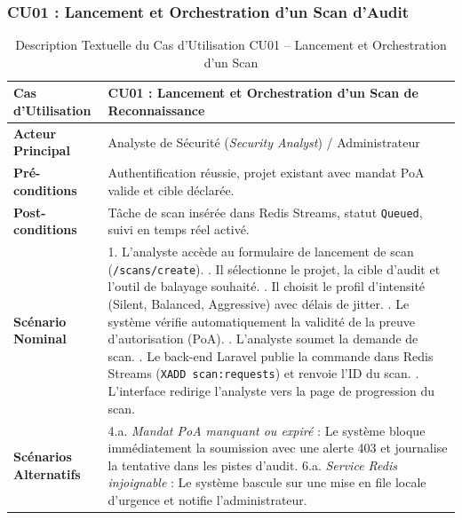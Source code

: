 \subsubsection*{CU01 : Lancement et Orchestration d'un Scan d'Audit}
\begin{table}[H]
\centering
\caption{Description Textuelle du Cas d'Utilisation CU01 -- Lancement et Orchestration d'un Scan}
\label{tab:cu01}
\begin{tabular}{|p{3.5cm}|p{11.5cm}|}
\hline
\textbf{Cas d'Utilisation} & \textbf{CU01 : Lancement et Orchestration d'un Scan de Reconnaissance} \\
\hline
\textbf{Acteur Principal} & Analyste de S\'ecurit\'e (\textit{Security Analyst}) / Administrateur \\
\hline
\textbf{Pr\'e-conditions} & Authentification r\'eussie, projet existant avec mandat PoA valide et cible d\'eclar\'ee. \\
\hline
\textbf{Post-conditions} & T\^ache de scan ins\'er\'ee dans Redis Streams, statut \texttt{Queued}, suivi en temps r\'eel activ\'e. \\
\hline
\textbf{Sc\'enario Nominal} & 
1. L'analyste acc\`ede au formulaire de lancement de scan (\texttt{/scans/create}). \newline
2. Il s\'electionne le projet, la cible d'audit et l'outil de balayage souhait\'e. \newline
3. Il choisit le profil d'intensit\'e (Silent, Balanced, Aggressive) avec d\'elais de jitter. \newline
4. Le syst\`eme v\'erifie automatiquement la validit\'e de la preuve d'autorisation (PoA). \newline
5. L'analyste soumet la demande de scan. \newline
6. Le back-end Laravel publie la commande dans Redis Streams (\texttt{XADD scan:requests}) et renvoie l'ID du scan. \newline
7. L'interface redirige l'analyste vers la page de progression du scan. \\
\hline
\textbf{Sc\'enarios Alternatifs} & 
4.a. \textit{Mandat PoA manquant ou expir\'e} : Le syst\`eme bloque imm\'ediatement la soumission avec une alerte 403 et journalise la tentative dans les pistes d'audit. \newline
6.a. \textit{Service Redis injoignable} : Le syst\`eme bascule sur une mise en file locale d'urgence et notifie l'administrateur. \\
\hline
\end{tabular}
\end{table}

